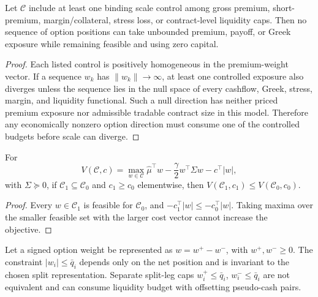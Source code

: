 \begin{proposition}\label{prop:no_free_option_exposure}
Let \(\mathcal C\) include at least one binding scale control among gross premium,
short-premium, margin/collateral, stress loss, or contract-level liquidity caps. Then no
sequence of option positions can take unbounded premium, payoff, or Greek exposure while
remaining feasible and using zero capital.
\end{proposition}

\begin{proof}
Each listed control is positively homogeneous in the premium-weight vector. If a sequence
\(w_k\) has \(\|w_k\|\to\infty\), at least one controlled exposure also diverges unless
the sequence lies in the null space of every cashflow, Greek, stress, margin, and liquidity
functional. Such a null direction has neither priced premium exposure nor admissible
tradable contract size in this model. Therefore any economically nonzero option direction
must consume one of the controlled budgets before scale can diverge.
\end{proof}

\begin{proposition}\label{prop:cost_constraint_monotonicity}
For
\[
  V(\mathcal C,c)=
  \max_{w\in\mathcal C}
  \widehat\mu^\top w-\frac{\gamma}{2}w^\top\Sigma w-c^\top |w|,
\]
with \(\Sigma\succeq0\), if \(\mathcal C_1\subseteq\mathcal C_0\) and
\(c_1\ge c_0\) elementwise, then \(V(\mathcal C_1,c_1)\le V(\mathcal C_0,c_0)\).
\end{proposition}

\begin{proof}
Every \(w\in\mathcal C_1\) is feasible for \(\mathcal C_0\), and
\(-c_1^\top|w|\le -c_0^\top|w|\). Taking maxima over the smaller feasible set with the
larger cost vector cannot increase the objective.
\end{proof}

\begin{proposition}\label{prop:net_caps_invariant}
Let a signed option weight be represented as \(w=w^+-w^-\), with \(w^+,w^-\ge0\). The
constraint \(|w_i|\le \bar q_i\) depends only on the net position and is invariant to the
chosen split representation. Separate split-leg caps \(w_i^+\le\bar q_i\),
\(w_i^-\le\bar q_i\) are not equivalent and can consume liquidity budget with offsetting
pseudo-cash pairs.
\end{proposition}

